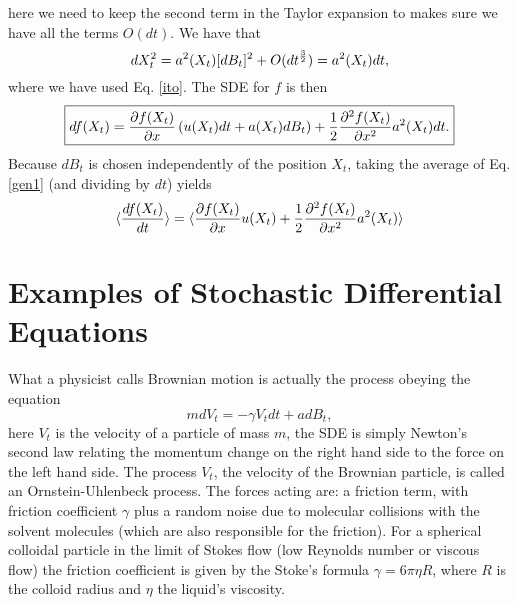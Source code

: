 \documentclass[11pt]{report}
\begin{document}
here we need to keep the second term in the Taylor expansion to makes sure we have all the terms $O(dt)$. We have that
\begin{equation}
dX_t^2 = a^2(X_t) [dB_t]^2 + O(dt^{3\over 2})= a^2(X_t) dt, 
\end{equation}
where we have used Eq. \eqref{ito}. The SDE for $f$ is then
\begin{equation}
\boxed{
df(X_t) = {\partial f(X_t)\over \partial x}\left(u(X_t) dt + a(X_t) dB_t\right) + {1\over 2} {\partial^2 f(X_t)\over \partial x^2}a^2(X_t) dt .} \label{gen1}
\end{equation}
Because $dB_t$ is chosen independently of the position $X_t$, taking the average of Eq. \eqref{gen1} (and dividing by $dt$) yields
\begin{equation}
\langle {d f(X_t)\over dt} \rangle = \langle {\partial f(X_t)\over \partial x}u(X_t)  + {1\over 2} {\partial^2 f(X_t)\over \partial x^2}a^2(X_t) \rangle
\end{equation}
\section{Examples of Stochastic Differential Equations}

What a physicist calls Brownian motion is actually the process obeying the equation
\begin{equation}
mdV_t = -\gamma V_t dt + a dB_t,\label{ou}
\end{equation}
here $V_t$ is the velocity of a particle of mass $m$, the SDE is simply Newton's second law relating the momentum change on the right hand side to the force on the left hand side.
The process $V_t$, the velocity of the Brownian particle, is called an Ornstein-Uhlenbeck process.  The forces acting are: a friction term, with friction coefficient $\gamma$ plus a random noise due to molecular collisions with the solvent molecules (which are also responsible for the friction). For a spherical colloidal particle in the limit of Stokes flow (low
Reynolds number or viscous flow) the friction coefficient is given by the Stoke's formula
$\gamma = 6\pi \eta R$, where $R$ is the colloid radius and $\eta$ the liquid's viscosity.
\end{document}
